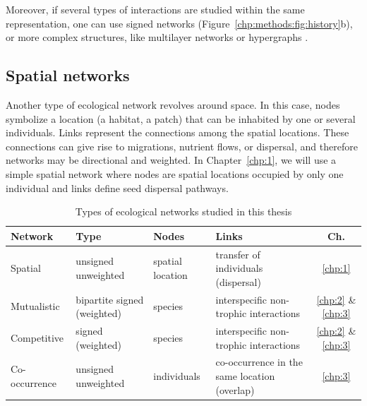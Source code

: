 Moreover, if several types of interactions are studied within the same representation, one can use signed networks (Figure~\ref{chp:methods:fig:history}b), or more complex structures, like multilayer networks \cite{pilosof2017multilayer} or hypergraphs \cite{golubski2016ecological}. \\

\subsection{Spatial networks}
Another type of ecological network revolves around space. In this case, nodes symbolize a location (a habitat, a patch) that can be inhabited by one or several individuals. Links represent the connections among the spatial locations. These connections can give rise to migrations, nutrient flows, or dispersal, and therefore networks may be directional and weighted. In Chapter~\ref{chp:1}, we will use a simple spatial network where nodes are spatial locations occupied by only one individual and links define seed dispersal pathways. \\

\begin{table}[t]
\centering
\caption{Types of ecological networks studied in this thesis}
\label{chp:methods:tab:networks}
\begin{tabularx}{1\textwidth}{ X X X X c}
\hline
\textbf{Network} & \textbf{Type}                                                                          & \textbf{Nodes}    & \textbf{Links}    & \textbf{Ch.}                              \\  
\hline
\hline
Spatial          & unsigned unweighted                      & spatial location & transfer of individuals (dispersal)    & \ref{chp:1}     \\
\hline
Mutualistic      &  bipartite signed (weighted) & species           & interspecific non-trophic interactions & \ref{chp:2} \& \ref{chp:3}     \\
\hline
Competitive      & signed (weighted)        & species           & interspecific non-trophic interactions & \ref{chp:2}  \& \ref{chp:3}     \\
\hline
Co-occurrence     & unsigned unweighted                        & individuals       & co-occurrence in the same location (overlap) & \ref{chp:3} \\
\hline
\end{tabularx}
\end{table}

